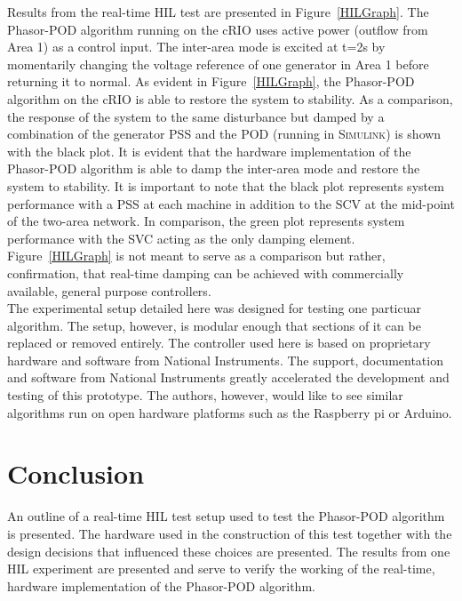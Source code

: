 \documentclass[conference]{IEEEtran}
\begin{document}
Results from the real-time HIL test are presented in Figure~\ref{HILGraph}. The Phasor-POD algorithm running on the cRIO uses active power (outflow from Area 1) as a control input. The inter-area mode is excited at t=2s by momentarily changing the voltage reference of one generator in Area 1 before returning it to normal. As evident in Figure~\ref{HILGraph}, the Phasor-POD algorithm on the cRIO is able to restore the system to stability. As a comparison, the response of the system to the same disturbance but damped by a combination of the generator PSS and the POD (running in \textsc{Simulink}) is shown with the black plot. It is evident that the hardware implementation of the Phasor-POD algorithm is able to damp the inter-area mode and restore the system to stability. It is important to note that the black plot represents system performance with a PSS at each machine in addition to the SCV at the mid-point of the two-area network. In comparison, the green plot represents system performance with the SVC acting as the only damping element. Figure~\ref{HILGraph} is not meant to serve as a comparison but rather, confirmation, that real-time damping can be achieved with commercially available, general purpose controllers.\\

The experimental setup detailed here was designed for testing one particuar algorithm. The setup, however, is modular enough that sections of it can be replaced or removed entirely. The controller used here is based on proprietary hardware and software from National Instruments. The support, documentation and software from National Instruments greatly accelerated the development and testing of this prototype. The authors, however, would like to see similar algorithms run on open hardware platforms such as the Raspberry pi or Arduino.



\section{Conclusion} \label{conclusion}
An outline of a real-time HIL test setup used to test the Phasor-POD algorithm is presented. The hardware used in the construction of this test together with the design decisions that influenced these choices are presented. The results from one HIL experiment are presented and serve to verify the working of the real-time, hardware implementation of the Phasor-POD algorithm.
\end{document}
